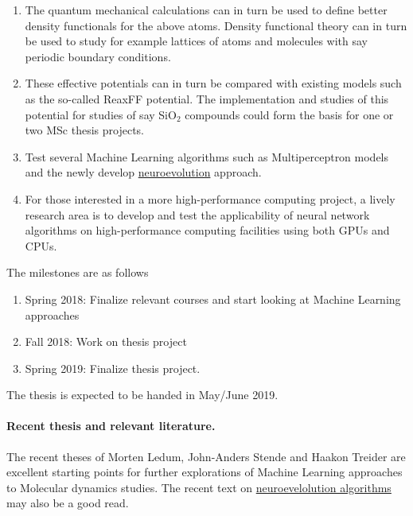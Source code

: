\documentclass[%
oneside,                 %
final,                   %
10pt]{article}
\begin{document}
\begin{enumerate}
\item The quantum mechanical calculations can in turn be used to define better density functionals for the above atoms. Density functional theory can in turn be used to study for example lattices of atoms and molecules with say periodic boundary conditions.  

\item These effective potentials can in turn be compared with existing models such as the so-called ReaxFF potential. The implementation and studies of this potential for studies of say SiO$_2$ compounds could form the basis for one or two MSc thesis projects. 

\item Test several Machine Learning algorithms such as Multiperceptron models and the newly develop \href{{https://www.oreilly.com/ideas/neuroevolution-a-different-kind-of-deep-learning}}{neuroevolution} approach. 

\item For those interested in a more high-performance computing project, a lively research area is to develop and test the applicability of neural network algorithms on high-performance computing facilities using both GPUs and CPUs. 
\end{enumerate}

\noindent
The milestones are as follows
\begin{enumerate}
\item Spring 2018: Finalize relevant courses and start looking at Machine Learning approaches

\item Fall 2018: Work on thesis project

\item Spring 2019: Finalize thesis project.
\end{enumerate}

\noindent
The thesis is expected to be handed in May/June  2019.



\paragraph{Recent thesis and relevant literature.}
The recent theses of Morten Ledum, John-Anders Stende and Haakon Treider are excellent starting points for further explorations of Machine Learning approaches to Molecular dynamics studies. The recent text on \href{{https://www.oreilly.com/ideas/neuroevolution-a-different-kind-of-deep-learning}}{neuroevelolution algorithms}  may also be a good read.










\end{document}
